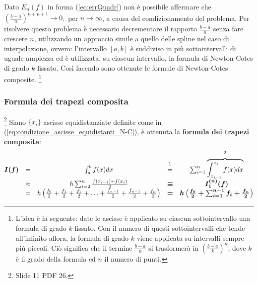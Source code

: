 Dato $E_n(f)$ in forma (\ref{eq:errQuadr}) non è possibile affermare che $\left(\frac{b-a}{n}\right)^{n+\mu +1}\rightarrow 0,$ per $ n\rightarrow\infty$, a causa del condizionamento del problema. Per risolvere questo problema è necessario decrementare il rapporto $\frac{b-a}{n}$ senza fare crescere $n$, utilizzando un approccio simile a quello delle spline nel caso di interpolazione, ovvero: l'intervallo $[a,b]$ è suddiviso in più sottointervalli di uguale ampiezza ed è utilizzata, su ciascun intervallo, la formula di Newton-Cotes di grado $k$ fissato. Così facendo sono ottenute le formule di Newton-Cotes composite.
\footnote{L'idea è la seguente: date le ascisse è applicato su ciascun sottointervallo una formula di grado $k$ fissato. Con il numero di questi sottointervalli che tende all'infinito allora, la formula di grado $k$ viene applicata su intervalli sempre più piccoli. Ciò significa che il termine $\frac{b-a}{n}$ si trasformerà in $\left(\frac{b-a}{k}\right)^n$, dove $k$ è il grado della formula ed $n$ il numero di punti.}

\subsubsection{Formula dei trapezi composita}
\begin{definition}\footnote{Slide 11 PDF 26.}
    Siano $\{x_i\}$ ascisse equidistanziate definite come in (\ref{eq:condizione_ascisse_equidistanti_N-C}), è ottenuta la \textbf{formula dei trapezi composita}:
    \begin{equation}\label{eq:formTrapComp}
        \begin{matrix}
            \boldsymbol{I(f)}&=&\int_a^b f(x) dx &\overset{\footnotemark}{=}&\sum_{i=1}^n\overbrace{\int_{x_{i-1}}^{x_i} f(x)dx}^{\footnotemark}\\
            &\approx& h\sum_{i=2}^n\frac{f(x_{i-1})+f(x_i)}{2} &\boldsymbol\equiv& \boldsymbol{I_1^{(n)}(f)}\\
            &=& h\left(\frac{f_0}{2}+\frac{f_1}{2}+\frac{f_1}{2}+\hdots +\frac{f_{n-1}}{2}+\frac{f_{n-1}}{2}+\frac{f_n}{2}\right)&\boldsymbol =&\boldsymbol{h\left(\frac{f_0}{2}+\sum_{i=1}^{n-1}f_i+\frac{f_n}{2}\right)}
        \end{matrix}
    \end{equation}
\end{definition}

\addtocounter{footnote}{-1}

